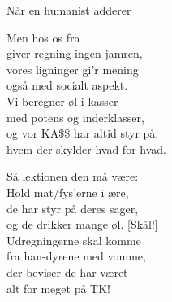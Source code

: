 \begin{song}{Når en humanist adderer}
  \begin{SBVerse}
    Men hos os fra \TKET{}\\
    giver regning ingen jamren,\\
    vores ligninger gi’r mening\\
    også med socialt aspekt.\\
    Vi beregner øl i kasser\\
    med potens og inderklasser,\\
    og vor KA\$\$ har altid styr på,\\
    hvem der skylder hvad for hvad.
  \end{SBVerse}

  \begin{SBVerse}
    Så lektionen den må være:\\
    Hold mat/fys’erne i ære,\\
    de har styr på deres sager,\\
    og de drikker mange øl. [Skål!]\\
    Udregningerne skal komme\\
    fra han-dyrene med vomme,\\
    der beviser de har været\\
    alt for meget på TK!
  \end{SBVerse}
\end{song}